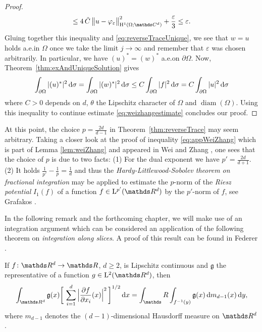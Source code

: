 \begin{proof}
\begin{align*}
    \leq 4 \, \tilde C \, \big\| u - \varphi_\varepsilon \big\|_{\HH^1(\Omega; \C^d)}^2 + \frac{\varepsilon}{3} 
    \leq \varepsilon.
  \end{align*}
  Gluing together this inequality and \eqref{eq:reverseTraceUnique}, we see that $w = u$ holds a.e.\@ in $\Omega$ once we take the limit $j \to \infty$ and remember that $\varepsilon$ was chosen arbitrarily.
  In particular, we have $(u)^* = (w)^*$ a.e.\@ on $\partial\Omega$.
  Now, Theorem~\ref{thm:exAndUniqueSolution} gives
  \begin{align*}
    \int_{\partial\Omega} |(u)^*|^2 \, {\operatorname{d}\!{\sigma}} 
    = \int_{\partial\Omega} |(w)^*|^2 \, {\operatorname{d}\!{\sigma}}
    \leq C \int_{\partial\Omega} |f|^2 \, {\operatorname{d}\!{\sigma}} 
    = C \int_{\partial\Omega} |u|^2 \, {\operatorname{d}\!{\sigma}}
  \end{align*}
  where $C> 0$ depends on $d$, $\theta$ the Lipschitz character of $\Omega$ and $\operatorname{diam}(\Omega)$.
  Using this inequality to continue estimate \eqref{eq:weizhangestimate} concludes our proof.
\end{proof}

\begin{rem}
  At this point, the choice $p = \frac{2d}{d - 1}$ in Theorem~\ref{thm:reverseTrace} may seem arbitrary.
  Taking a closer look at the proof of inequality \eqref{eq:appWeiZhang} which is part of Lemma \ref{lem:weiZhang} and appeared in Wei and Zhang \cite[Lem.\@~3.3]{weiZhang}, one sees that the choice of $p$ is due to two facts: (1) For the dual exponent we have $p' = \frac{2d}{d + 1}$. (2) It holds $\frac{1}{p'} - \frac{1}{p} = \frac{1}{d}$ and thus the \emph{Hardy-Littlewood-Sobolev theorem on fractional integration} may be applied to estimate the $p$-norm of the \emph{Riesz potential} $I_1(f)$ of a function $f \in \Ell^{p'}(\R^d)$ by the $p'$-norm of $f$, see Grafakos \cite[Thm.\@~6.1.3]{grafakos2009modern}.
\end{rem}

In the following remark and the forthcoming chapter, we will make use of an integration argument which can be considered an application of the following theorem on \emph{integration along slices}. A proof of this result can be found in Federer \cite[Thm.\@~3.2.12]{federer}.

\begin{thm}
  \label{thm:coarea}
  If $f \colon \R^d \to \R$, $d \geq 2$, is Lipschitz continuous and $\mathfrak{g}$ the representative of a function $g \in \Ell^2(\R^d)$, then
  \begin{align}
    \label{eq:coarea}
    \int_{\R^d} \mathfrak{g}(x) \bigg[ \, \sum_{i = 1}^d \Big|\frac{\partial f}{\partial x_i}(x)\Big|^2 \, \bigg]^{1/2} \d x 
    = \int_\R \int_{f^{-1}(y)} \mathfrak{g}(x) \d m_{d - 1}(x) \d y,
  \end{align}
  where $m_{d - 1}$ denotes the $(d - 1)$-dimensional Hausdorff measure on $\R^d$.
\end{thm}

